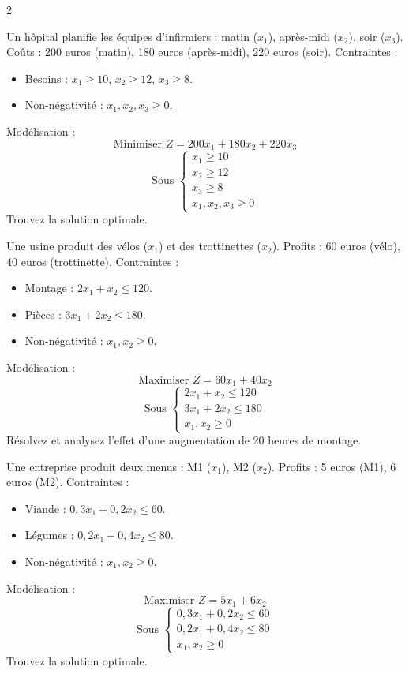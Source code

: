 \begin{multicols}{2}
\begin{exercice}
	Un hôpital planifie les équipes d'infirmiers : matin (\(x_1\)), après-midi (\(x_2\)), soir (\(x_3\)). Coûts : 200 euros (matin), 180 euros (après-midi), 220 euros (soir). Contraintes :
	\begin{itemize}
		\item Besoins : \(x_1 \geq 10\), \(x_2 \geq 12\), \(x_3 \geq 8\).
		\item Non-négativité : \(x_1, x_2, x_3 \geq 0\).
	\end{itemize}
	Modélisation :
	\[
	\text{Minimiser } Z = 200x_1 + 180x_2 + 220x_3
	\]
	\[
	\text{Sous } \begin{cases}
	x_1 \geq 10 \\
	x_2 \geq 12 \\
	x_3 \geq 8 \\
	x_1, x_2, x_3 \geq 0
	\end{cases}
	\]
	Trouvez la solution optimale.
\end{exercice}

\begin{exercice}
	Une usine produit des vélos (\(x_1\)) et des trottinettes (\(x_2\)). Profits : 60 euros (vélo), 40 euros (trottinette). Contraintes :
	\begin{itemize}
		\item Montage : \(2x_1 + x_2 \leq 120\).
		\item Pièces : \(3x_1 + 2x_2 \leq 180\).
		\item Non-négativité : \(x_1, x_2 \geq 0\).
	\end{itemize}
	Modélisation :
	\[
	\text{Maximiser } Z = 60x_1 + 40x_2
	\]
	\[
	\text{Sous } \begin{cases}
	2x_1 + x_2 \leq 120 \\
	3x_1 + 2x_2 \leq 180 \\
	x_1, x_2 \geq 0
	\end{cases}
	\]
	Résolvez et analysez l'effet d'une augmentation de 20 heures de montage.
\end{exercice}

\begin{exercice}
	Une entreprise produit deux menus : M1 (\(x_1\)), M2 (\(x_2\)). Profits : 5 euros (M1), 6 euros (M2). Contraintes :
	\begin{itemize}
		\item Viande : \(0,3x_1 + 0,2x_2 \leq 60\).
		\item Légumes : \(0,2x_1 + 0,4x_2 \leq 80\).
		\item Non-négativité : \(x_1, x_2 \geq 0\).
	\end{itemize}
	Modélisation :
	\[
	\text{Maximiser } Z = 5x_1 + 6x_2
	\]
	\[
	\text{Sous } \begin{cases}
	0,3x_1 + 0,2x_2 \leq 60 \\
	0,2x_1 + 0,4x_2 \leq 80 \\
	x_1, x_2 \geq 0
	\end{cases}
	\]
	Trouvez la solution optimale.
\end{exercice}


\end{multicols}
